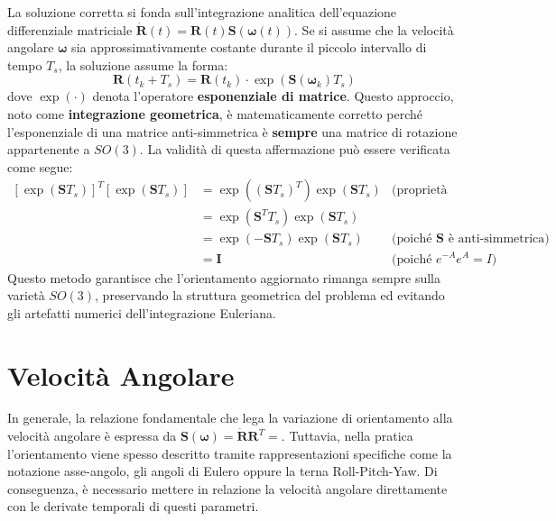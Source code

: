 \documentclass[11pt, a4paper]{report}
\begin{document}
La soluzione corretta si fonda sull'integrazione analitica dell'equazione differenziale matriciale \(\dot{\bm{R}}(t) = \bm{R}(t)\bm{S}(\bm{\omega}(t))\). Se si assume che la velocità angolare \(\bm{\omega}\) sia approssimativamente costante durante il piccolo intervallo di tempo \(T_s\), la soluzione assume la forma:
\[
    \bm{R}(t_k+T_s) = \bm{R}(t_k) \cdot \exp\left( \bm{S}(\bm{\omega}_k) T_s \right)
\]
dove \(\exp(\cdot)\) denota l'operatore \textbf{esponenziale di matrice}. Questo approccio, noto come \textbf{integrazione geometrica}, è matematicamente corretto perché l'esponenziale di una matrice anti-simmetrica è \textbf{sempre} una matrice di rotazione appartenente a \(SO(3)\). La validità di questa affermazione può essere verificata come segue:
\begin{align*}
    \left[\exp\left(\bm{S}T_s\right)\right]^T \left[\exp\left(\bm{S}T_s\right)\right] &= \exp\left((\bm{S}T_s)^T\right) \exp\left(\bm{S}T_s\right) & \text{(proprietà dell'esponenziale di matrice)} \\
    &= \exp\left(\bm{S}^T T_s\right) \exp\left(\bm{S}T_s\right) \\
    &= \exp\left(-\bm{S} T_s\right) \exp\left(\bm{S}T_s\right) & \text{(poiché \(\bm{S}\) è anti-simmetrica)} \\
    &= \bm{I} & \text{(poiché \(e^{-A}e^{A} = I\))}
\end{align*}
Questo metodo garantisce che l'orientamento aggiornato rimanga sempre sulla varietà \(SO(3)\), preservando la struttura geometrica del problema ed evitando gli artefatti numerici dell'integrazione Euleriana.
\newpage
\section{Velocità Angolare}
In generale, la relazione fondamentale che lega la variazione di orientamento alla velocità angolare è espressa da \(\bm{S}(\bm{\omega}) = \dot{\bm{R}}\bm{R}^{T} =\). Tuttavia, nella pratica l'orientamento viene spesso descritto tramite rappresentazioni specifiche come la notazione asse-angolo, gli angoli di Eulero oppure la terna Roll-Pitch-Yaw. Di conseguenza, è necessario mettere in relazione la velocità angolare direttamente con le derivate temporali di questi parametri.
\end{document}
